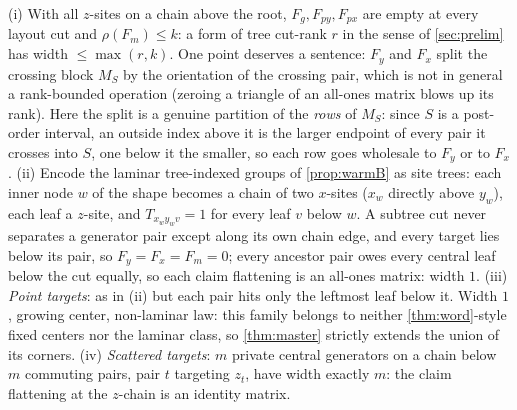 \documentclass[a4paper,UKenglish,autoref,anonymous]{lipics-v2021}
\newcommand{\mrk}{\rho}                              %
\begin{document}
\begin{example}
\label{ex:corners}
(i) With all $z$-sites on a chain above the root, $F_g, F_{py}, F_{px}$
are empty at every layout cut and $\mrk(F_m) \le k$: a form of tree
cut-rank $r$ in the sense of \autoref{sec:prelim} has width $\le \max(r,
k)$. One point deserves a sentence: $F_y$ and $F_x$ split the crossing
block $M_S$ by the orientation of the crossing pair, which is not in
general a rank-bounded operation (zeroing a triangle of an all-ones
matrix blows up its rank). Here the split is a genuine partition of the
\emph{rows} of $M_S$: since $S$ is a post-order interval, an outside
index above it is the larger endpoint of every pair it crosses into $S$,
one below it the smaller, so each row goes wholesale to $F_y$ or to
$F_x$.
(ii) Encode the laminar tree-indexed groups of \autoref{prop:warmB} as
site trees: each inner node $w$ of the shape becomes a chain of two
$x$-sites ($x_w$ directly above $y_w$), each leaf a $z$-site, and
$T_{x_w y_w v} = 1$ for every leaf $v$ below $w$. A subtree cut never
separates a generator pair except along its own chain edge, and every
target lies below its pair, so $F_y = F_x = F_m = 0$; every ancestor
pair owes every central leaf below the cut equally, so each claim
flattening is an all-ones matrix: width $1$.
(iii) \emph{Point targets}: as in (ii) but each pair hits only the
leftmost leaf below it. Width $1$, growing center, non-laminar law: this
family belongs to neither \autoref{thm:word}-style fixed centers nor the
laminar class, so \autoref{thm:master} strictly extends the union of its
corners.
(iv) \emph{Scattered targets}: $m$ private central generators on a chain
below $m$ commuting pairs, pair $t$ targeting $z_t$, have width exactly
$m$: the claim flattening at the $z$-chain is an identity matrix.
\end{example}
\end{document}
